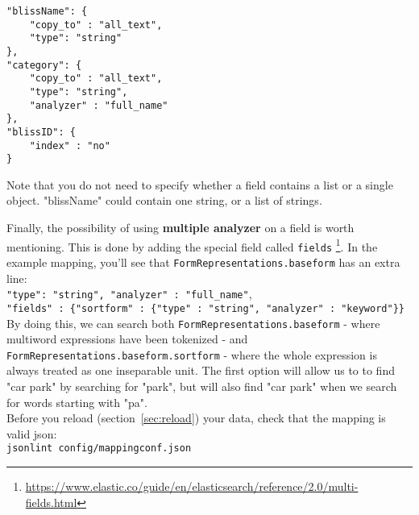 \documentclass[
12pt, %
a4paper, %
oneside, %
headinclude,footinclude, %
BCOR0mm, %
]{scrartcl}
\begin{document}
   \begin{verbatim}
"blissName": {
    "copy_to" : "all_text",
    "type": "string"
},
"category": {
    "copy_to" : "all_text",
    "type": "string", 
    "analyzer" : "full_name"
},
"blissID": {
    "index" : "no"
}
   \end{verbatim}
   Note that you do not need to specify whether a field contains a list or a single object. "blissName"
   could contain one string, or a list of strings.

   Finally, the possibility of using \textbf{multiple analyzer} on a field is worth mentioning.
   This is done by adding
   the special field called \verb|fields|%
  \footnote{\url{https://www.elastic.co/guide/en/elasticsearch/reference/2.0/multi-fields.html}}.
   In the example mapping, you'll see that \verb|FormRepresentations.baseform| has an extra line:\\
       \verb|"type": "string", "analyzer" : "full_name"|,\\
       \verb|"fields" : {"sortform" : {"type" : "string", "analyzer" : "keyword"}}|\\
  By doing this, we can search both \verb|FormRepresentations.baseform| - where multiword expressions
  have been tokenized - and \verb|FormRepresentations.baseform.sortform| - where the whole
  expression is always treated as one inseparable unit. The first option will allow us to to
  find "car park" by searching for "park", but will also find "car park" when we search for words starting
  with "pa".\\

  Before you reload (section~\ref{sec:reload}) your data, check that the mapping
  is valid json:\\
  \verb|jsonlint config/mappingconf.json|
\end{document}
